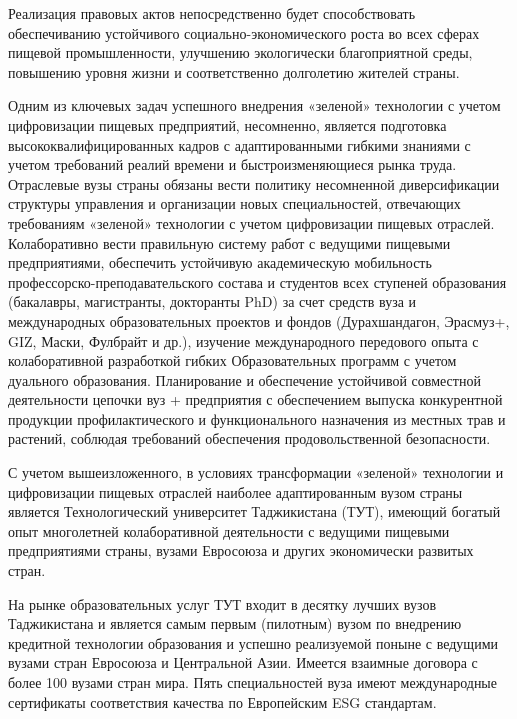 \begin{multicols}{2}
Реализация правовых актов непосредственно будет способствовать
обеспечиванию устойчивого социально-экономического роста во всех сферах
пищевой промышленности, улучшению экологически благоприятной среды,
повышению уровня жизни и соответственно долголетию жителей страны.

Одним из ключевых задач успешного внедрения «зеленой» технологии с
учетом цифровизации пищевых предприятий, несомненно, является подготовка
высококвалифицированных кадров с адаптированными гибкими знаниями с
учетом требований реалий времени и быстроизменяющиеся рынка труда.
Отраслевые вузы страны обязаны вести политику несомненной диверсификации
структуры управления и организации новых специальностей, отвечающих
требованиям «зеленой» технологии с учетом цифровизации пищевых отраслей.
Колаборативно вести правильную систему работ с ведущими пищевыми
предприятиями, обеспечить устойчивую академическую мобильность
профессорско-преподавательского состава и студентов всех ступеней
образования (бакалавры, магистранты, докторанты PhD) за счет средств
вуза и международных образовательных проектов и фондов (Дурахшандагон,
Эрасмуз+, GIZ, Маски, Фулбрайт и др.), изучение международного
передового опыта с колаборативной разработкой гибких Образовательных
программ с учетом дуального образования. Планирование и обеспечение
устойчивой совместной деятельности цепочки вуз + предприятия с
обеспечением выпуска конкурентной продукции профилактического и
функционального назначения из местных трав и растений, соблюдая
требований обеспечения продовольственной безопасности.

С учетом вышеизложенного, в условиях трансформации «зеленой» технологии
и цифровизации пищевых отраслей наиболее адаптированным вузом страны
является Технологический университет Таджикистана (ТУТ), имеющий богатый
опыт многолетней колаборативной деятельности с ведущими пищевыми
предприятиями страны, вузами Евросоюза и других экономически развитых
стран.

На рынке образовательных услуг ТУТ входит в десятку лучших вузов
Таджикистана и является самым первым (пилотным) вузом по внедрению
кредитной технологии образования и успешно реализуемой поныне с ведущими
вузами стран Евросоюза и Центральной Азии. Имеется взаимные договора с
более 100 вузами стран мира. Пять специальностей вуза имеют
международные сертификаты соответствия качества по Европейским ESG
стандартам.


\end{multicols}
